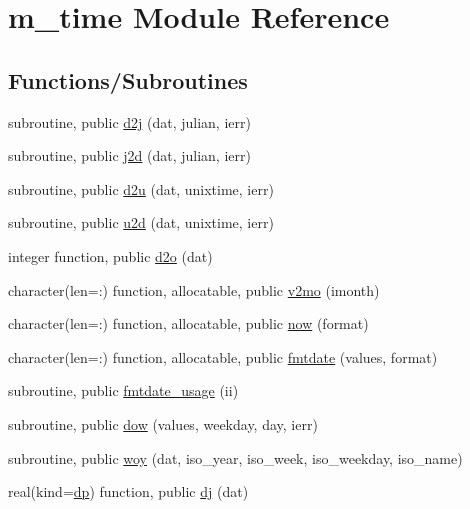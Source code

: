 \hypertarget{namespacem__time}{}\section{m\+\_\+time Module Reference}
\label{namespacem__time}
\subsection*{Functions/\+Subroutines}
\begin{DoxyCompactItemize}
\item 
subroutine, public \mbox{\hyperlink{namespacem__time_a12cbfe4ebed008f4cdf88df4358df8ad}{d2j}} (dat, julian, ierr)
\item 
subroutine, public \mbox{\hyperlink{namespacem__time_a4da84079c6587a8aaa8ef32169a84cc5}{j2d}} (dat, julian, ierr)
\item 
subroutine, public \mbox{\hyperlink{namespacem__time_ac4bd98688e1277ab6cfc16697331406c}{d2u}} (dat, unixtime, ierr)
\item 
subroutine, public \mbox{\hyperlink{namespacem__time_a6c01c810eb2acce767d2f24b9aaefa56}{u2d}} (dat, unixtime, ierr)
\item 
integer function, public \mbox{\hyperlink{namespacem__time_a727dd77bbd4a5d0e3947c5d303845947}{d2o}} (dat)
\item 
character(len=\+:) function, allocatable, public \mbox{\hyperlink{namespacem__time_a6f28cf00e4998bb50bb503f5e4bd3f77}{v2mo}} (imonth)
\item 
character(len=\+:) function, allocatable, public \mbox{\hyperlink{namespacem__time_a6b5e87be0e510ff268c1ecfbf67a3bdb}{now}} (format)
\item 
character(len=\+:) function, allocatable, public \mbox{\hyperlink{namespacem__time_a2cb84c9b8af4f395b76aed76e1431328}{fmtdate}} (values, format)
\item 
subroutine, public \mbox{\hyperlink{namespacem__time_a0ec30ca32f18ec409bbbef046a9e73f0}{fmtdate\+\_\+usage}} (ii)
\item 
subroutine, public \mbox{\hyperlink{namespacem__time_adfda8a89820b8d0ad4581a14896e4ce5}{dow}} (values, weekday, day, ierr)
\item 
subroutine, public \mbox{\hyperlink{namespacem__time_aea9216971a364d79beb307f36e9e3873}{woy}} (dat, iso\+\_\+year, iso\+\_\+week, iso\+\_\+weekday, iso\+\_\+name)
\item 
real(kind=\mbox{\hyperlink{namespacem__time_a95f16e7435244d114f0a451625dc189a}{dp}}) function, public \mbox{\hyperlink{namespacem__time_ad3ce73217cd51090b52a0468b045c0f3}{dj}} (dat)

\end{DoxyCompactItemize}
